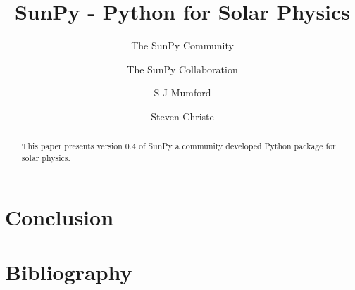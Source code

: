 \documentclass[12pt]{iopart}
\begin{document}
\title{SunPy - Python for Solar Physics}

\author{The SunPy Community}
\address{\url{http://sunpy.org}}

\author{The SunPy Collaboration}
\address{}

\author{S J Mumford}
\address{Solar Physics \& Space Plasma Research Centre (SP$^{2}$RC), School of 
Mathematics and Statistics, The University of Sheffield, Hicks Building, 
Hounsfield Road, Sheffield, S3 7RH U.K.}

\author{Steven Christe}
\address{NASA Goddard Space Flight Center, Greenbelt, U.S.A.}

\begin{abstract}
This paper presents version 0.4 of SunPy a community developed Python package 
for solar physics.

\end{abstract}

\maketitle


\label{sec:Intro}


\label{sec:DataTypes}


\label{sec:retrevial}


\label{sec:util}


\label{sec:dev}


\label{sec:future}

\section{Conclusion}

\section*{Bibliography}

{}
\end{document}
